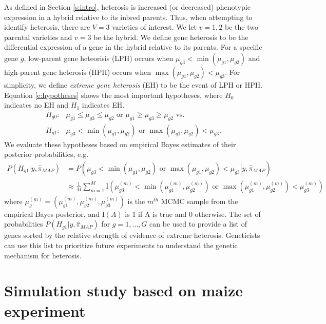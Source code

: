 \documentclass[useAMS,usenatbib,referee]{biom}
\begin{document}
As defined in Section \ref{s:intro}, heterosis is increased (or decreased) phenotypic expression in a hybrid relative to its inbred parents. Thus, when attempting to identify heterosis, there are $V=3$ varieties of interest. We let $v=1,2$ be the two parental varieties and $v=3$ be the hybrid. We define gene heterosis to be the differential expression of a gene in the hybrid relative to its parents. For a specific gene $g$, low-parent gene heteorisis (LPH) occurs when $\mu_{g3}< \min(\mu_{g1},\mu_{g2})$ 
and high-parent gene heterosis (HPH) occurs when $\max(\mu_{g1},\mu_{g2}) < \mu_{g3}$. For simplicity, we define \emph{extreme gene heterosis} (EH) to be the event of LPH or HPH. Equation \eqref{e:hypotheses} shows the most important hypotheses, where $H_0$ indicates no EH and $H_1$ indicates EH. 
\begin{align}
H_{g0}:&\mu_{g1}\le \mu_{g3}\le \mu_{g2} \mbox{ or } \mu_{g1}\ge \mu_{g3}\ge \mu_{g2} \mbox{\ \ vs.\ \ } \nonumber \\
H_{g1}:&\mu_{g3}< \min(\mu_{g1},\mu_{g2}) \mbox{ or } \max(\mu_{g1},\mu_{g2}) < \mu_{g3}.
\label{e:hypotheses}
\end{align}
We evaluate these hypotheses based on empirical Bayes estimates of their posterior probabilities, e.g. 
\begin{align}
P\left(H_{g1}|y, \hat{\pi}_{MAP}\right) &= P\left(\left.\mu_{g3}< \min(\mu_{g1},\mu_{g2}) \mbox{ or } \max(\mu_{g1},\mu_{g2}) < \mu_{g3}\right| y, \hat{\pi}_{MAP}\right) \nonumber \\
&\approx \frac{1}{M} \sum_{m=1}^M \mathrm{I}\left(\mu_{g3}^{(m)}< \min\left(\mu_{g1}^{(m)},\mu_{g2}^{(m)}\right) \mbox{ or } \max\left(\mu_{g1}^{(m)},\mu_{g2}^{(m)}\right) < \mu_{g3}^{(m)}\right) \label{e:probs}
\end{align}
where $\mu_g^{(m)} = \left(\mu_{g1}^{(m)},\mu_{g2}^{(m)},\mu_{g3}^{(m)}\right)$ is the $m^{th}$ MCMC sample from the empirical Bayes posterior, and $\mathrm{I}(A)$ is 1 if A is true and 0 otherwise. The set of probabilities $P\left(H_{g1}|y, \hat{\pi}_{MAP}\right)$ for $g=1,\ldots,G$ can be used to provide a list of genes sorted by the relative strength of evidence of extreme heterosis. Geneticists can use this list to prioritize future experiments to understand the genetic mechanism for heterosis.  

\section{Simulation study based on maize experiment}
\label{s:simulation}
\end{document}
